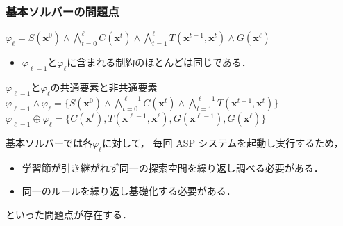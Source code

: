 \documentclass[dvipdfmx,11pt]{beamer}
\begin{document}
\begin{frame}\frametitle{基本ソルバーの問題点}

  \begin{block}{}
    \centering
    $
      \varphi_{\ell} = S(\bm{x}^0)
      \land \bigwedge_{t=0}^{\ell} C(\bm{x}^t) 
      \land \bigwedge_{t=1}^{\ell} T(\bm{x}^{t-1},\bm{x}^{t})
      \land G(\bm{x}^\ell)
    $
  \end{block}
  
  \begin{itemize}
    \item $\varphi_{\ell-1}$と$\varphi_{\ell}$に含まれる制約のほとんどは同じである．
  \end{itemize}

  \begin{block}{$\varphi_{\ell-1}$と$\varphi_{\ell}$の共通要素と非共通要素}
    \centering
    $
      \varphi_{\ell -1} \land \varphi_{\ell} =
      \{S(\bm{x}^0) \land \bigwedge_{t=0}^{\ell-1} C(\bm{x}^t)
      \land \bigwedge_{t=1}^{\ell-1} T(\bm{x}^{t-1},\bm{x}^{t})\}
    $
    $
      \varphi_{\ell -1} \oplus \varphi_{\ell} = 
      \{C(\bm{x}^{\ell}), T(\bm{x}^{\ell -1}, 
      \bm{x}^{\ell}), G(\bm{x}^{\ell -1}), G(\bm{x}^{\ell})\}
    $
  \end{block}
  \pause
  \bigskip

  基本ソルバーでは各$\varphi_{\ell}$に対して，
  毎回 ASP システムを起動し実行するため，
  \begin{itemize}
    \item 学習節が引き継がれず同一の探索空間を繰り返し調べる必要がある．
    \item 同一のルールを繰り返し基礎化する必要がある．
  \end{itemize}
  といった問題点が存在する．

\end{frame}
\end{document}
